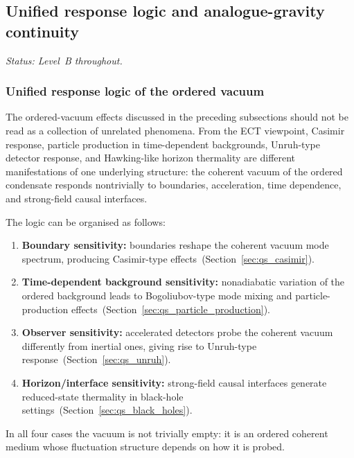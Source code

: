 \subsection{Unified response logic and analogue-gravity continuity}
\label{sec:qs_vacuum_unified}

\textit{Status: Level~B throughout.}

\medskip

\subsubsection*{Unified response logic of the ordered vacuum}

The ordered-vacuum effects discussed in the preceding subsections
should not be read as a collection of unrelated phenomena.
From the ECT viewpoint, Casimir response, particle production in
time-dependent backgrounds, Unruh-type detector response, and
Hawking-like horizon thermality are different manifestations of one
underlying structure: the coherent vacuum of the ordered condensate
responds nontrivially to boundaries, acceleration, time dependence,
and strong-field causal interfaces.

The logic can be organised as follows:
\begin{enumerate}[label=(\roman*)]
  \item \textbf{Boundary sensitivity:}
    boundaries reshape the coherent vacuum mode spectrum, producing
    Casimir-type effects~(Section~\ref{sec:qs_casimir}).
  \item \textbf{Time-dependent background sensitivity:}
    nonadiabatic variation of the ordered background leads to
    Bogoliubov-type mode mixing and particle-production
    effects~(Section~\ref{sec:qs_particle_production}).
  \item \textbf{Observer sensitivity:}
    accelerated detectors probe the coherent vacuum differently
    from inertial ones, giving rise to Unruh-type
    response~(Section~\ref{sec:qs_unruh}).
  \item \textbf{Horizon/interface sensitivity:}
    strong-field causal interfaces generate reduced-state
    thermality in black-hole
    settings~(Section~\ref{sec:qs_black_holes}).
\end{enumerate}
In all four cases the vacuum is not trivially empty: it is an
ordered coherent medium whose fluctuation structure depends on
how it is probed.


